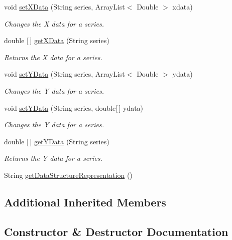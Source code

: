 \begin{DoxyCompactItemize}
void \hyperlink{classbridges_1_1base_1_1_line_chart_a2f141ec46fdafd92fb0d86900a2de46a}{set\+X\+Data} (String series, Array\+List$<$ Double $>$ xdata)
\begin{DoxyCompactList}\small\item\em Changes the X data for a series. \end{DoxyCompactList}\item 
double \mbox{[}$\,$\mbox{]} \hyperlink{classbridges_1_1base_1_1_line_chart_a34ef6ace0633d287a78d0e224f38f2ed}{get\+X\+Data} (String series)
\begin{DoxyCompactList}\small\item\em Returns the X data for a series. \end{DoxyCompactList}\item 
void \hyperlink{classbridges_1_1base_1_1_line_chart_a3076dc99debb599529169de40815aba2}{set\+Y\+Data} (String series, Array\+List$<$ Double $>$ ydata)
\begin{DoxyCompactList}\small\item\em Changes the Y data for a series. \end{DoxyCompactList}\item 
void \hyperlink{classbridges_1_1base_1_1_line_chart_aa8094fad197ae35d93f9feab5de91f59}{set\+Y\+Data} (String series, double\mbox{[}$\,$\mbox{]} ydata)
\begin{DoxyCompactList}\small\item\em Changes the Y data for a series. \end{DoxyCompactList}\item 
double \mbox{[}$\,$\mbox{]} \hyperlink{classbridges_1_1base_1_1_line_chart_a2bf257f45c1056808b41581af1f83645}{get\+Y\+Data} (String series)
\begin{DoxyCompactList}\small\item\em Returns the Y data for a series. \end{DoxyCompactList}\item 
String \hyperlink{classbridges_1_1base_1_1_line_chart_a1d481880dc94fc8c2dfdcf64d2de2a3b}{get\+Data\+Structure\+Representation} ()
\end{DoxyCompactItemize}
\subsection*{Additional Inherited Members}


\subsection{Constructor \& Destructor Documentation}
\mbox{\label{classbridges_1_1base_1_1_line_chart_ae864fe5ae85e80ae2f035471fb216e68}} 
